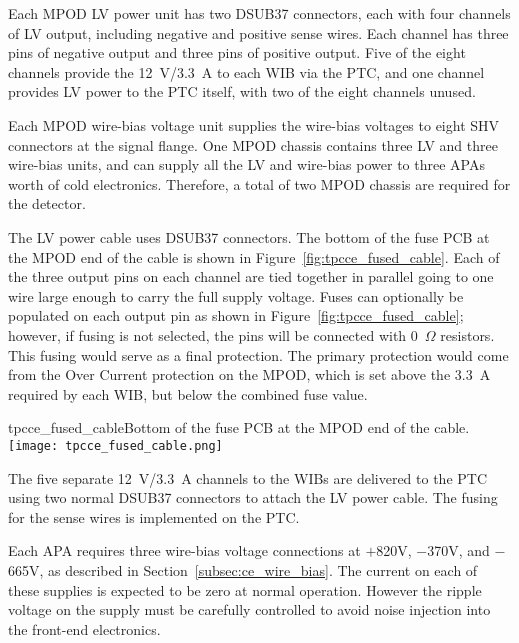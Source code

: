 Each MPOD LV power unit has two DSUB37 connectors, each with four channels of LV output, including negative
and positive sense wires. %
Each channel has three pins
of negative output and three pins of positive output. Five of the eight channels
provide the 12~V/3.3~A to each WIB via the PTC, and one channel provides LV power 
to the PTC itself, with two of the eight channels unused.


Each MPOD wire-bias voltage unit supplies the wire-bias voltages to eight SHV connectors 
at the signal flange. One MPOD chassis contains three LV and three wire-bias units, and can
supply all the LV and wire-bias power to three APAs worth of cold electronics. Therefore,
a total of two MPOD chassis are required for the detector.


The LV power cable uses DSUB37 connectors. The bottom of the fuse PCB at the MPOD 
end of the cable is shown in Figure~\ref{fig:tpcce_fused_cable}. Each of the three output pins on
each channel are tied together in parallel 
going to one wire large enough to carry the full supply voltage. Fuses can optionally be 
populated on each output pin as shown in Figure~\ref{fig:tpcce_fused_cable}; however, if
fusing is not selected, the pins will be connected with 0~$\Omega$ resistors. This fusing would serve as
a final protection. The primary protection would come from the Over Current protection
on the MPOD, which is set above the 3.3~A required by each WIB, but below the
combined fuse value.

\begin{cdrfigure}{tpcce_fused_cable}{Bottom of the fuse PCB at the MPOD end of the cable.}
\texttt{[image: tpcce\_fused\_cable.png]}
\end{cdrfigure}

The five separate 12~V/3.3~A channels to the WIBs are delivered to the PTC using two normal DSUB37 connectors to
attach the LV power cable. The fusing for the sense wires is implemented on the PTC.

Each APA requires three wire-bias voltage connections 
at $+$820V, $-$370V, and $-$665V, as described in Section~\ref{subsec:ce_wire_bias}.
The current on each of these supplies is expected to be zero at normal operation.
However the ripple voltage on the supply must be carefully controlled 
to avoid noise injection into the front-end electronics.

